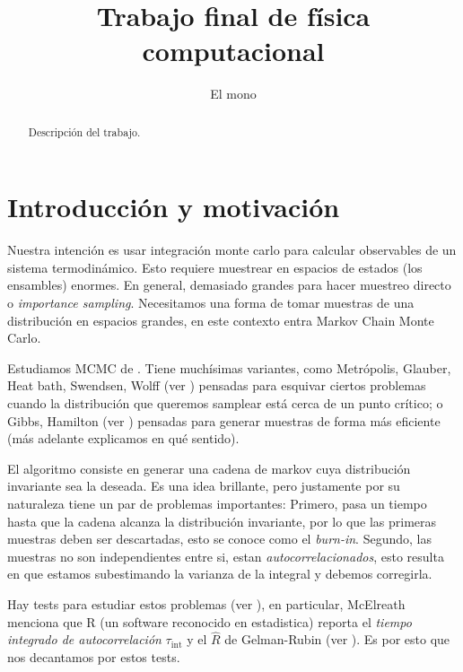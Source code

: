 \documentclass[a4paper, 12pt]{article}
\title{Trabajo final de física computacional}
\author{El mono}
\date{}
\newcommand{\tauint}{\tau_\text{int}}
\begin{document}
\maketitle

\begin{abstract}
    Descripción del trabajo.
\end{abstract}

\section{Introducción y motivación}

Nuestra intención es usar integración monte carlo para calcular observables de un sistema termodinámico. Esto requiere muestrear en espacios de estados (los ensambles) enormes. En general, demasiado grandes para hacer muestreo directo o {\it importance sampling}. Necesitamos una forma de tomar muestras de una distribución en espacios grandes, en este contexto entra Markov Chain Monte Carlo.

Estudiamos MCMC de \cite{schachinger2007mcmc, mcelreath2016statistical, klenke2007probability}. Tiene muchísimas variantes, como Metrópolis, Glauber, Heat bath, Swendsen, Wolff (ver \cite{janke2012montecarlo, metropolis1953equation}) pensadas para esquivar ciertos problemas cuando la distribución que queremos samplear está cerca de un punto crítico; o Gibbs, Hamilton (ver \cite{klenke2007probability, mcelreath2016statistical}) pensadas para generar muestras de forma más eficiente (más adelante explicamos en qué sentido).

El algoritmo consiste en generar una cadena de markov cuya distribución invariante sea la deseada. Es una idea brillante, pero justamente por su naturaleza tiene un par de problemas importantes: Primero, pasa un tiempo hasta que la cadena alcanza la distribución invariante, por lo que las primeras muestras deben ser descartadas, esto se conoce como el {\it burn-in}. Segundo, las muestras no son independientes entre si, estan {\it autocorrelacionados}, esto resulta en que estamos subestimando la varianza de la integral y debemos corregirla.

Hay tests para estudiar estos problemas (ver \cite{vivekanada2020convergence, mcelreath2016statistical, schachinger2007mcmc}), en particular, McElreath menciona que R (un software reconocido en estadistica) reporta el {\it tiempo integrado de autocorrelación} $\tauint$ y el $\hat{R}$ de Gelman-Rubin (ver \cite{gelman1992inference, gelman2013bayesian}). Es por esto que nos decantamos por estos tests.
\end{document}
